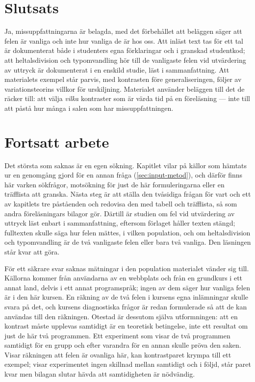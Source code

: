 \section{Slutsats}
\label{sec:input-slutsats}

Ja, missuppfattningarna är belagda, med det förbehållet att beläggen
säger att felen är vanliga och inte hur vanliga de är hos oss.  Att
inläst text tas för ett tal är dokumenterat både i studenters egna
förklaringar\autocite{GuoMarkelZhang2020} och i granskad
studentkod\autocite{Bosse2021Antipatterns}; att heltalsdivision och
typomvandling hör till de vanligaste felen vid utvärdering av uttryck är
dokumenterat i en enskild studie, läst i
sammanfattning\autocite{Gobil2009Errors}.  Att materialets exempel står
parvis, med kontrasten före generaliseringen, följer av
variationsteorins villkor för urskiljning\autocite[45--47]{Marton2015}.
Materialet använder beläggen till det de räcker till: att välja
\emph{vilka} kontraster som är värda tid på en föreläsning --- inte till
att påstå hur många i salen som har missuppfattningen.


\section{Fortsatt arbete}
\label{sec:input-fortsatt}

Det största som saknas är en egen sökning.  Kapitlet vilar på källor
som hämtats ur en genomgång gjord för en annan fråga
(\cref{sec:input-metod}), och därför finns här varken sökfrågor,
motsökning för just de här formuleringarna eller en träfflista att
granska.  Nästa steg är att ställa den tvåsidiga frågan för vart och
ett av kapitlets tre påståenden och redovisa den med tabell och
träfflista, så som andra föreläsningars bilagor gör.  Därtill är
studien om fel vid utvärdering av uttryck läst enbart i
sammanfattning\autocite{Gobil2009Errors}, eftersom förlaget håller
texten stängd; fulltexten skulle säga hur felen mättes, i vilken
population, och om heltalsdivision och typomvandling är de två
vanligaste felen eller bara två vanliga.  Den läsningen står kvar att
göra.

För ett säkrare svar saknas mätningar i den population materialet
vänder sig till.  Källorna kommer från användarna av en webbplats och
från en grundkurs i ett annat land, delvis i ett annat programspråk;
ingen av dem säger hur vanliga felen är i den här kursen.  En räkning
av de två felen i kursens egna inlämningar skulle svara på det, och
kursens diagnostiska frågor är redan formulerade så att de kan användas
till den räkningen.  Otestad är dessutom själva utformningen: att en
kontrast måste upplevas samtidigt är en teoretisk
betingelse\autocite[45--47]{Marton2015}, inte ett resultat om just de
här två programmen.  Ett experiment som visar de två programmen
samtidigt för en grupp och efter varandra för en annan skulle pröva den
saken.  Visar räkningen att felen är ovanliga här, kan kontrastparet
krympa till ett exempel; visar experimentet ingen skillnad mellan
samtidigt och i följd, står paret kvar men bilagan slutar hävda att
samtidigheten är nödvändig.

